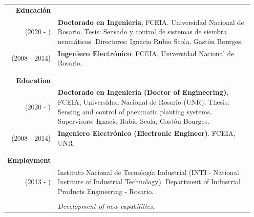 \documentclass[a4paper,10pt, sans]{article}
\begin{document}
\begin{table}[H]
\begin{tabularx}{\textwidth}{r X}         
    \textbf{Educación} & {} \\ [1ex]
       (2020 - ) & \textbf{Doctorado en Ingeniería}, FCEIA, Universidad Nacional de Rosario. Tesis: Sensado y control de sistemas de siembra neumáticos. Directores: Ignacio Rubio Scola, Gastón Bourges.\\ [1ex]
       (2008 - 2014) & \textbf{Ingeniero Electrónico}. FCEIA, Universidad Nacional de Rosario.\\ \\ \hline \\
    
    \textbf{Education} & {} \\ [1ex]
       (2020 - ) & \textbf{Doctorado en Ingeniería (Doctor of Engineering)}, FCEIA, Universidad Nacional de Rosario (UNR). Thesis: Sensing and control of pneumatic planting systems. Supervisors: Ignacio Rubio Scola, Gastón Bourges.\\ [1ex]
       (2008 - 2014) & \textbf{Ingeniero Electrónico (Electronic Engineer)}. FCEIA, UNR.\\ \\ \hline \\
    \textbf{Employment} & {}\\ [1ex]
      (2013 - ) & Instituto Nacional de Tecnología Industrial (INTI - National Institute of Industrial Technology). Department of Industrial Products Engineering - Rosario.\\ \\
            
        {} & \hspace{2cm} \textit{Development of new capabilities.} \\ [1ex]
        

\end{tabularx}
\end{table}
\end{document}
